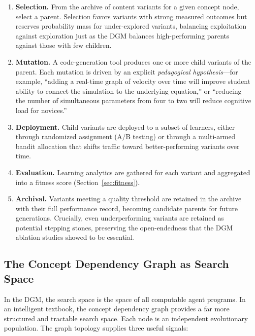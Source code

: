\begin{enumerate}
    \item \textbf{Selection.} From the archive of content variants for a given
          concept node, select a parent. Selection favors variants with strong
          measured outcomes but reserves probability mass for under-explored
          variants, balancing exploitation against exploration just as the DGM
          balances high-performing parents against those with few children.

    \item \textbf{Mutation.} A code-generation tool produces one or more child
          variants of the parent. Each mutation is driven by an explicit
          \textit{pedagogical hypothesis}---for example, ``adding a real-time
          graph of velocity over time will improve student ability to connect
          the simulation to the underlying equation,'' or ``reducing the number
          of simultaneous parameters from four to two will reduce cognitive
          load for novices.''

    \item \textbf{Deployment.} Child variants are deployed to a subset of
          learners, either through randomized assignment (A/B testing) or
          through a multi-armed bandit allocation that shifts traffic toward
          better-performing variants over time.

    \item \textbf{Evaluation.} Learning analytics are gathered for each variant
          and aggregated into a fitness score (Section~\ref{sec:fitness}).

    \item \textbf{Archival.} Variants meeting a quality threshold are retained
          in the archive with their full performance record, becoming candidate
          parents for future generations. Crucially, even underperforming
          variants are retained as potential stepping stones, preserving the
          open-endedness that the DGM ablation studies showed to be essential.
\end{enumerate}

\subsection{The Concept Dependency Graph as Search Space}

In the DGM, the search space is the space of all computable agent programs.
In an intelligent textbook, the concept dependency graph provides a far more
structured and tractable search space. Each node is an independent
evolutionary population. The graph topology supplies three useful signals:

